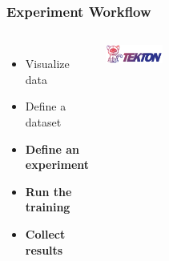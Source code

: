 \documentclass[aspectratio=169,11pt,hyperref={colorlinks=true}]{beamer}
\begin{document}
\begin{frame}
    \frametitle{Experiment Workflow}
    \begin{columns}
        \begin{itemize}
            \item{Visualize data}
            \item{Define a dataset}
            \item{\textbf{Define an experiment}}
            \item{\textbf{Run the training}}
            \item{\textbf{Collect results}}
        \end{itemize}
        \vspace{0.1\paperheight}
        \begin{center}
          \includegraphics[width=0.4\textwidth]{img/tekton.png}
        \end{center}
          \begin{figure}
            
          \end{figure}
          \begin{figure}
            
          \end{figure}
    \end{columns}
\end{frame}
\end{document}
